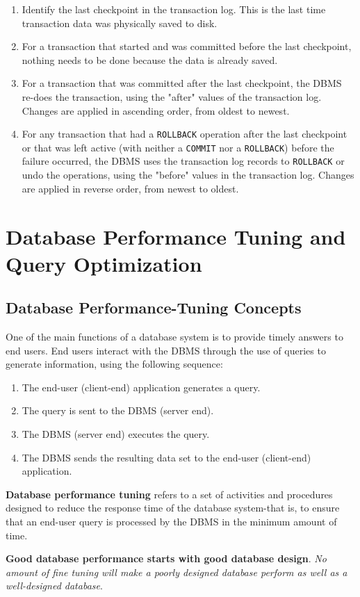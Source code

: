 \documentclass[a4paper, 11pt, titlepage]{report}
\begin{document}
\begin{enumerate}
\item Identify the last checkpoint in the transaction log. This is the last time transaction
data was physically saved to disk.
\item For a transaction that started and was committed before the last checkpoint, nothing
needs to be done because the data is already saved.
\item For a transaction that was committed after the last checkpoint, the DBMS re-does
the transaction, using the "after" values of the transaction log. Changes are applied in
ascending order, from oldest to newest.
\item For any transaction that had a \texttt{ROLLBACK} operation after the last checkpoint or that was left active (with neither a \texttt{COMMIT} nor a \texttt{ROLLBACK}) before the failure occurred, the DBMS uses the transaction log records to \texttt{ROLLBACK} or undo the operations, using the "before" values in the transaction log. Changes are applied in reverse order, from newest to oldest.
\end{enumerate}
\chapter{Database Performance Tuning and Query Optimization}
\section{Database Performance-Tuning Concepts}
One of the main functions of a database system is to provide timely answers to end users. End users interact with the DBMS through the use of queries to generate information, using the following sequence:
\begin{enumerate}
\item The end-user (client-end) application generates a query.
\item The query is sent to the DBMS (server end).
\item The DBMS (server end) executes the query.
\item The DBMS sends the resulting data set to the end-user (client-end) application.
\end{enumerate}
\textbf{Database performance tuning} refers to a set of activities and procedures designed to reduce the response time of the database system-that is, to ensure that an end-user query is processed by the DBMS in the minimum amount of time.
\begin{center}
\textbf{Good database performance starts with good database design}. \textit{No amount of fine tuning will make a poorly designed database perform as well as a well-designed database}. 
\end{center}
\end{document}

